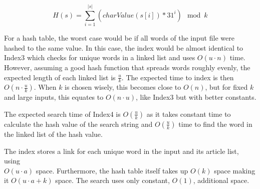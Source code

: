 \begin{equation}\label{eq:hashfunc}
    H(s)= \sum_{i=1}^{|s|}\left(charValue(s[i])*31^i\right) \mod k
\end{equation}

For a hash table, the worst case would be if all words of the input file were hashed to the same value. In this case, the index would be almost identical to Index3 which checks for unique words in a linked list and uses $O(u\cdot n)$ time. However, assuming a good hash function that spreads words roughly evenly, the expected length of each linked list is $\frac{u}{k}$. The expected time to index is then $O(n\cdot \frac{u}{k})$. When $k$ is chosen wisely, this becomes close to $O(n)$, but for fixed $k$ and large inputs, this equates to $O(n\cdot u)$, like Index3 but with better constants. 

The expected search time of Index4 is $O(\frac{u}{k})$ as it takes constant time to calculate the hash value of the search string and $O(\frac{u}{k})$ time to find the word in the linked list of the hash value. 

The index stores a link for each unique word in the input and its article list, using \\$O(u\cdot a)$ space. Furthermore, the hash table itself takes up $O(k)$ space making it $O(u\cdot a+k)$ space. The search uses only constant, $O(1)$, additional space. 
